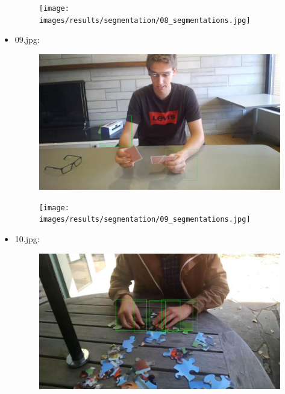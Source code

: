 \begin{itemize}
\begin{figure}[!htb]
\begin{minipage}{0.5\textwidth}
            \end{minipage}\hfill
            \begin{minipage}{0.5\textwidth}
                \centering
                \texttt{[image: images/results/segmentation/08\_segmentations.jpg]}
            \end{minipage}
        \end{figure}
    \newpage
    \item 09.jpg:
        \begin{figure}[!htb]
            \begin{minipage}{0.5\textwidth}
                \centering
                \includegraphics[scale = 0.205]{images/results/detection/09_detections.jpg}
            \end{minipage}\hfill
            \begin{minipage}{0.5\textwidth}
                \centering
                \texttt{[image: images/results/segmentation/09\_segmentations.jpg]}
            \end{minipage}
        \end{figure}
    \item 10.jpg:
        \begin{figure}[!htb]
            \begin{minipage}{0.5\textwidth}
                \centering
                \includegraphics[scale = 0.205]{images/results/detection/10_detections.jpg}

\end{minipage}
\end{figure}
\end{itemize}
